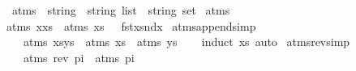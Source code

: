 %
\begin{isabellebody}%
%
%
\isadelimtheory
%
\endisadelimtheory
%
\isatagtheory
%
\endisatagtheory
{\isafoldtheory}%
%
\isadelimtheory
%
\endisadelimtheory
%
\isadelimdocument
%
\endisadelimdocument
%
\isatagdocument
%
\isamarkuptrue%
%
\endisatagdocument
{\isafolddocument}%
%
\isadelimdocument
%
\endisadelimdocument
{}\isamarkupfalse%
\ atms\ {\isacharcolon}{\kern0pt}{\isacharcolon}{\kern0pt}\ {\isachardoublequoteopen}{\isacharparenleft}{\kern0pt}string\ {\isasymtimes}\ string{\isacharparenright}{\kern0pt}\ list\ {\isasymRightarrow}\ string\ set{\isachardoublequoteclose}\ \isanewline
{\isachardoublequoteopen}atms\ {\isacharbrackleft}{\kern0pt}{\isacharbrackright}{\kern0pt}\ {\isacharequal}{\kern0pt}\ {\isacharbraceleft}{\kern0pt}{\isacharbraceright}{\kern0pt}{\isachardoublequoteclose}\ {\isacharbar}{\kern0pt}\ \isanewline
{\isachardoublequoteopen}atms\ {\isacharparenleft}{\kern0pt}x{\isacharhash}{\kern0pt}xs{\isacharparenright}{\kern0pt}\ {\isacharequal}{\kern0pt}\ {\isacharparenleft}{\kern0pt}{\isacharparenleft}{\kern0pt}atms\ xs{\isacharparenright}{\kern0pt}\ {\isasymunion}\ \ {\isacharbraceleft}{\kern0pt}fst{\isacharparenleft}{\kern0pt}x{\isacharparenright}{\kern0pt}{\isacharcomma}{\kern0pt}snd{\isacharparenleft}{\kern0pt}x{\isacharparenright}{\kern0pt}{\isacharbraceright}{\kern0pt}{\isacharparenright}{\kern0pt}{\isachardoublequoteclose}\isanewline
\isanewline
{}\isamarkupfalse%
\ atms{\isacharunderscore}{\kern0pt}append{\isacharbrackleft}{\kern0pt}simp{\isacharbrackright}{\kern0pt}{\isacharcolon}{\kern0pt}\ \isanewline
\ \ \ {\isachardoublequoteopen}atms\ {\isacharparenleft}{\kern0pt}xs{\isacharat}{\kern0pt}ys{\isacharparenright}{\kern0pt}\ {\isacharequal}{\kern0pt}\ atms\ xs\ {\isasymunion}\ atms\ ys{\isachardoublequoteclose}\isanewline
%
\isadelimproof
\ \ %
\endisadelimproof
%
\isatagproof
{}\isamarkupfalse%
\ {\isacharparenleft}{\kern0pt}induct\ xs{\isacharparenright}{\kern0pt}\ auto%
\endisatagproof
{\isafoldproof}%
%
\isadelimproof
\isanewline
%
\endisadelimproof
\isanewline
{}\isamarkupfalse%
\ atms{\isacharunderscore}{\kern0pt}rev{\isacharbrackleft}{\kern0pt}simp{\isacharbrackright}{\kern0pt}{\isacharcolon}{\kern0pt}\ \isanewline
\ \ \ {\isachardoublequoteopen}atms\ {\isacharparenleft}{\kern0pt}rev\ pi{\isacharparenright}{\kern0pt}\ {\isacharequal}{\kern0pt}\ atms\ pi{\isachardoublequoteclose}\isanewline

\end{isabellebody}
